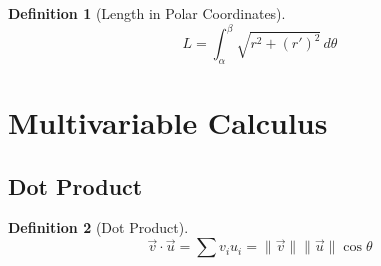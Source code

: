 \documentclass[11pt]{article}
\theoremstyle{definition}
\newtheorem{definition}{Definition}[section]
\theoremstyle{remark}
\begin{document}
\begin{definition}[Length in Polar Coordinates]
\begin{equation}
L = \int_\alpha^\beta \sqrt{r^2+(r')^2} \, d\theta
\end{equation}
\end{definition}

\section{Multivariable Calculus}
\subsection{Dot Product}
\begin{definition}[Dot Product]
\begin{equation}
\vec{v}\cdot \vec{u}=\sum v_i u_i = \|\vec{v}\| \|\vec{u}\| \cos \theta
\end{equation}
\end{definition}
\end{document}

